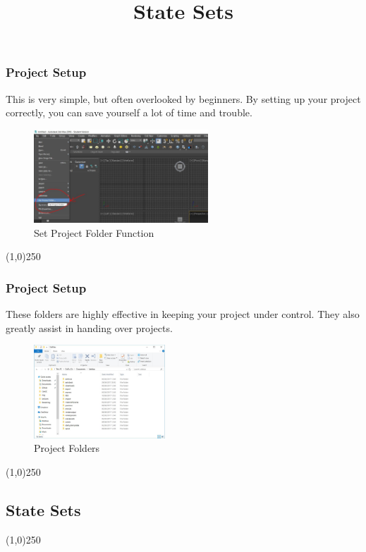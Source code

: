 \begin{frame}
\frametitle{Project Setup}
This is very simple, but often overlooked by beginners.  By setting up your project correctly, you can save yourself a lot of time and trouble.
\begin{figure}
\centering
\includegraphics[height=3.5cm]{img/setProject}
\caption[Set Project Folder Function]{Set Project Folder Function}
\label{fig:setproject}
\end{figure}
\end{frame}
\begin{center}\line(1,0){250}\end{center}


\begin{frame}
\frametitle{Project Setup}
These folders are highly effective in keeping your project under control.  They also greatly assist in handing over projects.
\begin{figure}
\centering
\includegraphics[height=3.5cm]{img/ProjectFolders}
\caption[Project Folders]{Project Folders}
\label{fig:projectFolders}
\end{figure}
\end{frame}
\begin{center}\line(1,0){250}\end{center}


\subsection{State Sets}

\begin{frame}
\title[State Sets]{State Sets}
\titlepage
\end{frame}\begin{center}\line(1,0){250}\end{center}




